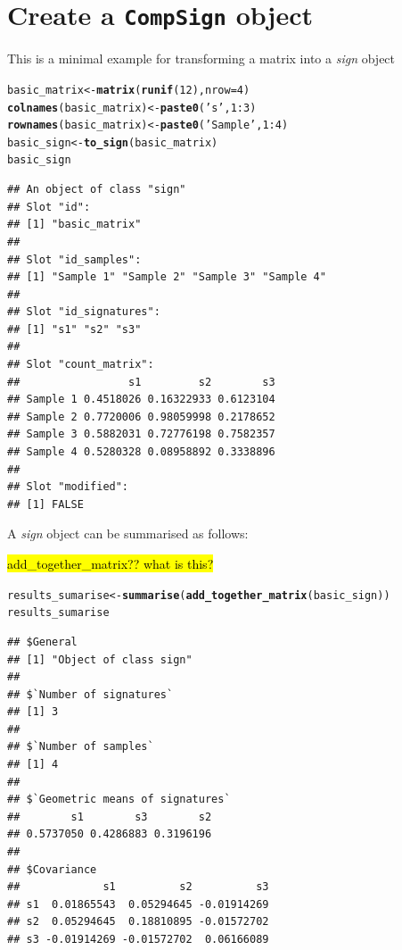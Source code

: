 \documentclass{article}\usepackage[]{graphicx}\usepackage[]{color}
\makeatletter
\newcommand{\hlnum}[1]{\textcolor[rgb]{0.686,0.059,0.569}{#1}}%
\newcommand{\hlstr}[1]{\textcolor[rgb]{0.192,0.494,0.8}{#1}}%
\newcommand{\hlopt}[1]{\textcolor[rgb]{0,0,0}{#1}}%
\newcommand{\hlstd}[1]{\textcolor[rgb]{0.345,0.345,0.345}{#1}}%
\newcommand{\hlkwb}[1]{\textcolor[rgb]{0.69,0.353,0.396}{#1}}%
\newcommand{\hlkwc}[1]{\textcolor[rgb]{0.333,0.667,0.333}{#1}}%
\newcommand{\hlkwd}[1]{\textcolor[rgb]{0.737,0.353,0.396}{\textbf{#1}}}%
\newenvironment{kframe}{%
 \def\at@end@of@kframe{}%
 \ifinner\ifhmode%
  \def\at@end@of@kframe{\end{minipage}}%
  \begin{minipage}{\columnwidth}%
 \fi\fi%
 \def\FrameCommand##1{\hskip\@totalleftmargin \hskip-\fboxsep
 \colorbox{shadecolor}{##1}\hskip-\fboxsep
     \hskip-\linewidth \hskip-\@totalleftmargin \hskip\columnwidth}%
 \MakeFramed {\advance\hsize-\width
   \@totalleftmargin\z@ \linewidth\hsize
   \@setminipage}}%
 {\par\unskip\endMakeFramed%
 \at@end@of@kframe}
\newenvironment{knitrout}{}{} %
\makeatother
\begin{document}
\section{Create a \texttt{CompSign} object}
This is a minimal example for transforming a matrix into a \emph{sign} object
\begin{knitrout}
\color{fgcolor}\begin{kframe}
\begin{alltt}
\hlstd{basic_matrix} \hlkwb{<-} \hlkwd{matrix}\hlstd{(}\hlkwd{runif}\hlstd{(}\hlnum{12}\hlstd{),} \hlkwc{nrow} \hlstd{=} \hlnum{4}\hlstd{)}
\hlkwd{colnames}\hlstd{(basic_matrix)} \hlkwb{<-} \hlkwd{paste0}\hlstd{(}\hlstr{'s'}\hlstd{,} \hlnum{1}\hlopt{:}\hlnum{3}\hlstd{)}
\hlkwd{rownames}\hlstd{(basic_matrix)} \hlkwb{<-} \hlkwd{paste0}\hlstd{(}\hlstr{'Sample '}\hlstd{,} \hlnum{1}\hlopt{:}\hlnum{4}\hlstd{)}
\hlstd{basic_sign} \hlkwb{<-} \hlkwd{to_sign}\hlstd{(basic_matrix)}
\hlstd{basic_sign}
\end{alltt}
\begin{verbatim}
## An object of class "sign"
## Slot "id":
## [1] "basic_matrix"
## 
## Slot "id_samples":
## [1] "Sample 1" "Sample 2" "Sample 3" "Sample 4"
## 
## Slot "id_signatures":
## [1] "s1" "s2" "s3"
## 
## Slot "count_matrix":
##                 s1         s2        s3
## Sample 1 0.4518026 0.16322933 0.6123104
## Sample 2 0.7720006 0.98059998 0.2178652
## Sample 3 0.5882031 0.72776198 0.7582357
## Sample 4 0.5280328 0.08958892 0.3338896
## 
## Slot "modified":
## [1] FALSE
\end{verbatim}
\end{kframe}
\end{knitrout}

A \emph{sign} object can be summarised as follows:

\hl{add\_together\_matrix?? what is this?}

\begin{knitrout}
\color{fgcolor}\begin{kframe}
\begin{alltt}
\hlstd{results_sumarise} \hlkwb{<-} \hlkwd{summarise}\hlstd{(}\hlkwd{add_together_matrix}\hlstd{(basic_sign))}
\hlstd{results_sumarise}
\end{alltt}
\begin{verbatim}
## $General
## [1] "Object of class sign"
## 
## $`Number of signatures`
## [1] 3
## 
## $`Number of samples`
## [1] 4
## 
## $`Geometric means of signatures`
##        s1        s3        s2 
## 0.5737050 0.4286883 0.3196196 
## 
## $Covariance
##             s1          s2          s3
## s1  0.01865543  0.05294645 -0.01914269
## s2  0.05294645  0.18810895 -0.01572702
## s3 -0.01914269 -0.01572702  0.06166089
\end{verbatim}
\end{kframe}
\end{knitrout}
\end{document}
